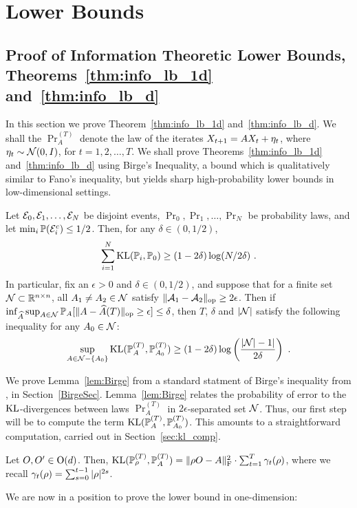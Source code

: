 \section{Lower Bounds}

\subsection{Proof of Information Theoretic Lower Bounds, Theorems~\ref{thm:info_lb_1d} and~\ref{thm:info_lb_d}\label{sec:lb_proofs}}
 In this section we prove Theorem~\ref{thm:info_lb_1d} and~\ref{thm:info_lb_d}. We shall the $\Pr_{A}^{(T)}$ denote the law of the iterates $X_{t+1} = AX_{t} + \eta_t$, where $\eta_t \sim \mathcal{N}(0,I)$, for $t = 1,2,\dots,T$. We shall prove Theorems~\ref{thm:info_lb_1d} and~\ref{thm:info_lb_d} using Birge's Inequality, a bound which is qualitatively similar to Fano's inequality, but yields sharp high-probability lower bounds in low-dimensional settings.
\begin{lem}\label{lem:Birge} Let $\mathcal{E}_0,\mathcal{E}_1,\dots,\mathcal{E}_N$ be disjoint events, $\Pr_0,\Pr_1,\dots,\Pr_N$ be probability laws, and let $\min_{i}\mathbb{P}(\mathcal{E}_i^c) \le 1/2$. Then, for any $\delta \in (0,1/2)$,
\begin{eqnarray}
\sum_{i=1}^N \mathrm{KL}(\mathbb{P}_i,\mathbb{P}_0) \ge (1-2\delta) \log(N/2\delta)~.
\end{eqnarray}
In particular, fix an $\epsilon > 0$ and $\delta \in (0,1/2)$, and suppose that for a finite set $\mathcal{N} \subset \mathbb{R}^{n \times n}$, all $A_1 \ne A_2 \in \mathcal{N}$ satisfy $\|\mathcal{A}_1 - \mathcal{A}_2\|_{\mathrm{op}} \ge 2\epsilon$. Then if $\inf_{\widehat{A}}\sup_{A \in \mathcal{N}} \mathbb{P}_{A}[\|A - \widehat{A}(T)\|_{\mathrm{op}} \ge \epsilon] \le \delta$, then $T$, $\delta$ and $|\mathcal{N}|$ satisfy the following inequality for any $A_0 \in \mathcal{N}$:
\begin{eqnarray}
\sup_{A \in \mathcal{N} - \{A_0\}}\mathrm{KL}(\mathbb{P}_{A}^{(T)},\mathbb{P}_{A_0}^{(T)}) \ge (1-2\delta) \log\left(\frac{|\mathcal{N}| - 1|}{2\delta}\right)~.
\end{eqnarray}
\end{lem}
We prove Lemma~\ref{lem:Birge} from a standard statment of Birge's inequality from \citep[Theorem 4.20]{boucheron13}, in Section~\ref{BirgeSec}. Lemma~\ref{lem:Birge} relates the probability of error to the $\mathrm{KL}$-divergences between laws $\Pr_{A}^{(T)}$ in $2\epsilon$-separated set $\mathcal{N}$. Thus, our first step will be to compute the term $\mathrm{KL}(\mathbb{P}_{A}^{(T)},\mathbb{P}_{A_0}^{(T)})$. This amounts to a straightforward computation, carried out in Section~\ref{sec:kl_comp}.
\begin{lem}\label{kl_comp} Let $O,O' \in \mathrm{O}(d)$. Then, $\mathrm{KL}(\mathbb{P}_{\rho}^{(T)},\mathbb{P}_{A}^{(T)}) =  \lVert \rho O - A \rVert_{\mathrm{F}}^2 \cdot \sum_{t=1}^T \gamma_{t}(\rho)$, where we recall $\gamma_{t}(\rho) = \sum_{s=0}^{t-1} |\rho|^{2s}$.
\end{lem}
We are now in a position to prove the lower bound in one-dimension:

